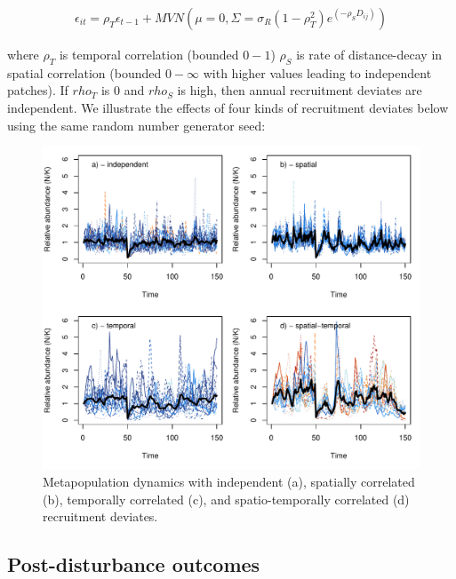 \documentclass[]{article}
\begin{document}
\begin{align}
\epsilon_{it}=\rho_T\epsilon_{t-1}+MVN(\mu=0,\Sigma=\sigma_R(1-\rho_T^2)e^{(-\rho_SD_{ij})})
\end{align}

where \(\rho_T\) is temporal correlation (bounded \(0-1\)) \(\rho_S\) is
rate of distance-decay in spatial correlation (bounded \(0-\infty\) with
higher values leading to independent patches). If \(rho_T\) is 0 and
\(rho_S\) is high, then annual recruitment deviates are independent. We
illustrate the effects of four kinds of recruitment deviates below using
the same random number generator seed:

\begin{figure}[H]

{\centering \includegraphics{Managing_for_ecological_surprises_in_metapopulations_files/figure-latex/independent stochasticity-1} 

}

\caption{Metapopulation dynamics with independent (a), spatially correlated (b), temporally correlated (c), and spatio-temporally correlated (d) recruitment deviates.}\label{fig:independent stochasticity}
\end{figure}

\hypertarget{post-disturbance-outcomes}{%
\subsection{Post-disturbance outcomes}\label{post-disturbance-outcomes}}
\end{document}
